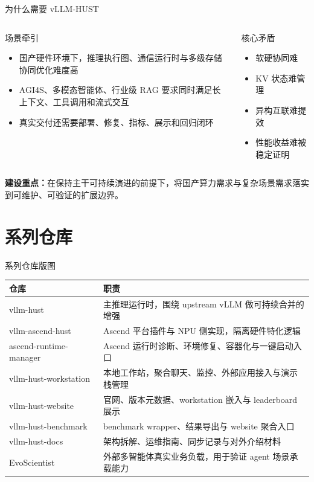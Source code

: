 \documentclass[aspectratio=169,11pt,fontset=none]{ctexbeamer}
\begin{document}
\begin{frame}{为什么需要 vLLM-HUST}
  \begin{columns}[T]
    \begin{block}{场景牵引}
      \begin{itemize}
        \item 国产硬件环境下，推理执行图、通信运行时与多级存储协同优化难度高
        \item AGI4S、多模态智能体、行业级 RAG 要求同时满足长上下文、工具调用和流式交互
        \item 真实交付还需要部署、修复、指标、展示和回归闭环
      \end{itemize}
    \end{block}

    \begin{alertblock}{核心矛盾}
      \begin{itemize}
        \item 软硬协同难
        \item KV 状态难管理
        \item 异构互联难提效
        \item 性能收益难被稳定证明
      \end{itemize}
    \end{alertblock}
  \end{columns}

  \vspace{0.5em}
  \centering
  \textbf{建设重点：}在保持主干可持续演进的前提下，将国产算力需求与复杂场景需求落实到可维护、可验证的扩展边界。
\end{frame}

\section{系列仓库}

\begin{frame}{系列仓库版图}
  \small
  \begin{tabular}{p{}p{}}
    \textbf{仓库} & \textbf{职责} \\
    \hline
    vllm-hust & 主推理运行时，围绕 upstream vLLM 做可持续合并的增强 \\
    vllm-ascend-hust & Ascend 平台插件与 NPU 侧实现，隔离硬件特化逻辑 \\
    ascend-runtime-manager & Ascend 运行时诊断、环境修复、容器化与一键启动入口 \\
    vllm-hust-workstation & 本地工作站，聚合聊天、监控、外部应用接入与演示栈管理 \\
    vllm-hust-website & 官网、版本元数据、workstation 嵌入与 leaderboard 展示 \\
    vllm-hust-benchmark & benchmark wrapper、结果导出与 website 聚合入口 \\
    vllm-hust-docs & 架构拆解、运维指南、同步记录与对外介绍材料 \\
    EvoScientist & 外部多智能体真实业务负载，用于验证 agent 场景承载能力 \\
  \end{tabular}
\end{frame}
\end{document}
